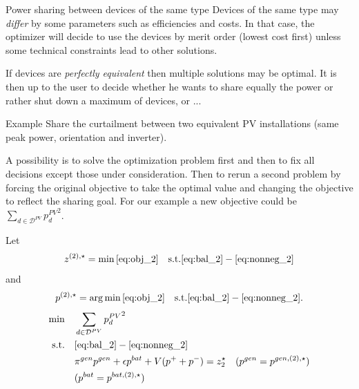 \begin{frame}[allowframebreaks]{Power sharing between devices of the same type}
    Devices of the same type may \textit{differ} by some parameters such as efficiencies and costs. 
    In that case, the optimizer will decide to use the devices by \alert{merit order} (lowest cost first) unless some technical constraints lead to other solutions.

    If devices are \textit{perfectly equivalent} then \alert{multiple solutions} may be optimal.
    It is then up to the user to decide whether he wants to share equally the power or rather shut down a maximum of devices, or ...
    
    \begin{block}{Example}
        Share the curtailment between two equivalent PV installations (same peak power, orientation and inverter).    
    \end{block}
    A possibility is to solve the optimization problem first and then to fix all decisions except those under consideration.
    Then to rerun a second problem by forcing the original objective to take the optimal value and changing the objective to reflect the sharing goal.
    For our example a new objective could be $\sum_{d \in\mathcal{D}^{PV}} {p^{PV}_d}^2$.

    Let $$z^{(2), \star} = \min \eqref{eq:obj_2} \quad \text{s.t.} \eqref{eq:bal_2} - \eqref{eq:nonneg_2}$$
    and $$p^{(2), \star} = \arg \min \eqref{eq:obj_2} \quad \text{s.t.} \eqref{eq:bal_2} - \eqref{eq:nonneg_2}.$$
    \begin{subequations}
        \label{eq:RT3}
    \begin{align}
    \min        \quad  & \sum_{d \in\mathcal{D}^{PV}} {p^{PV}_d}^2 \label{eq:obj_3}\\
    \text{s.t.} \quad  & \eqref{eq:bal_2} - \eqref{eq:nonneg_2}  \label{eq:const_3} \\
                       & \pi^{gen} p^{gen}  + \epsilon p^{bat} + V (p^+ + p^-) = z_2^\star \label{eq:eq_obj_3}%
                       & (p^{gen} = p^{gen, (2), \star})\\
                       & (p^{bat} = p^{bat, (2), \star})
    \end{align}
    \end{subequations}

\end{frame}

